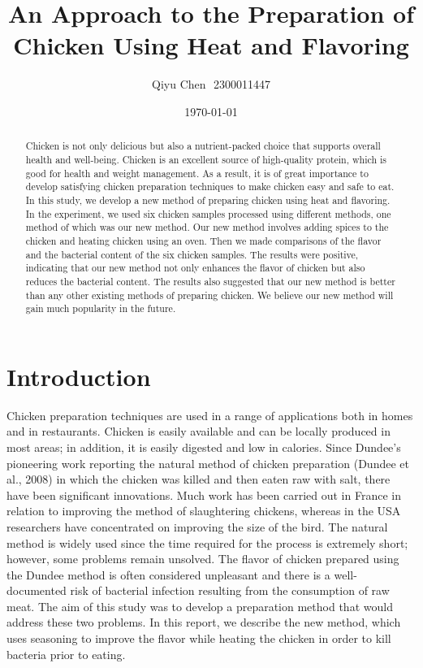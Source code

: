 \documentclass[a4paper,12pt]{article}
\author{Qiyu Chen\,\, 2300011447}
\title{An Approach to the Preparation of Chicken Using Heat and Flavoring}
\date{\today}
\begin{document}
	\maketitle
    \begin{abstract}
        Chicken is not only delicious but also a nutrient-packed choice that supports overall health and well-being. Chicken is an excellent source of high-quality protein, which is good for health and weight management\cite{hhy}. As a result, it is of great importance to develop satisfying chicken preparation techniques to make chicken easy and safe to eat. In this study, we develop a new method of preparing chicken using heat and flavoring. In the experiment, we used six chicken samples processed using different methods, one method of which was our new method. Our new method involves adding spices to the chicken and heating chicken using an oven. Then we made comparisons of the flavor and the bacterial content of the six chicken samples. The results were positive, indicating that our new method not only enhances the flavor of chicken but also reduces the bacterial content. The results also suggested that our new method is better than any other existing methods of preparing chicken. We believe our new method will gain much popularity in the future.
    \end{abstract}
	\section{Introduction}
	Chicken preparation techniques are used in a range of applications both in homes and in restaurants. Chicken is easily available and can be locally produced in most areas; in addition, it is easily digested and low in calories.
	Since Dundee’s pioneering work reporting the natural method of chicken preparation (Dundee et al., 2008) in which the chicken was killed and then eaten raw with salt, there have been significant innovations. Much work has been carried out in France in relation to improving the method of slaughtering chickens, whereas in the USA researchers have concentrated on improving the size of the bird. The natural method is widely used since the time required for the process is extremely short; however, some problems remain unsolved. The flavor of chicken prepared using the Dundee method is often considered unpleasant and there is a well-documented risk of bacterial infection resulting from the consumption of raw meat.
	The aim of this study was to develop a preparation method that would address these two problems. In this report, we describe the new method, which uses seasoning to improve the flavor while heating the chicken in order to kill bacteria prior to eating. 
\end{document}
